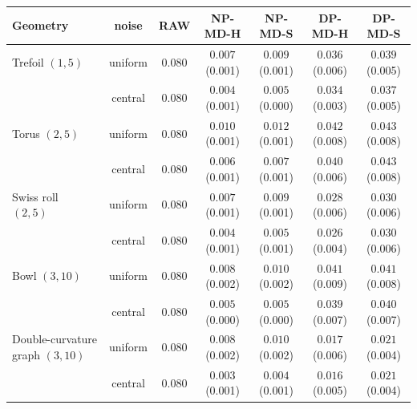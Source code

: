 \begin{tabular}{lcccccc}
\toprule
Geometry & noise & RAW & NP-MD-H & NP-MD-S & DP-MD-H & DP-MD-S \\
\midrule
Trefoil $(1,5)$ & uniform & $0.080$ & $0.007$ \scriptsize(0.001) & $0.009$ \scriptsize(0.001) & $0.036$ \scriptsize(0.006) & $0.039$ \scriptsize(0.005) \\
 & central & $0.080$ & $0.004$ \scriptsize(0.001) & $0.005$ \scriptsize(0.000) & $0.034$ \scriptsize(0.003) & $0.037$ \scriptsize(0.005) \\
\midrule
Torus $(2,5)$ & uniform & $0.080$ & $0.010$ \scriptsize(0.001) & $0.012$ \scriptsize(0.001) & $0.042$ \scriptsize(0.008) & $0.043$ \scriptsize(0.008) \\
 & central & $0.080$ & $0.006$ \scriptsize(0.001) & $0.007$ \scriptsize(0.001) & $0.040$ \scriptsize(0.006) & $0.043$ \scriptsize(0.008) \\
\midrule
Swiss roll $(2,5)$ & uniform & $0.080$ & $0.007$ \scriptsize(0.001) & $0.009$ \scriptsize(0.001) & $0.028$ \scriptsize(0.006) & $0.030$ \scriptsize(0.006) \\
 & central & $0.080$ & $0.004$ \scriptsize(0.001) & $0.005$ \scriptsize(0.001) & $0.026$ \scriptsize(0.004) & $0.030$ \scriptsize(0.006) \\
\midrule
Bowl $(3,10)$ & uniform & $0.080$ & $0.008$ \scriptsize(0.002) & $0.010$ \scriptsize(0.002) & $0.041$ \scriptsize(0.009) & $0.041$ \scriptsize(0.008) \\
 & central & $0.080$ & $0.005$ \scriptsize(0.000) & $0.005$ \scriptsize(0.000) & $0.039$ \scriptsize(0.007) & $0.040$ \scriptsize(0.007) \\
\midrule
Double-curvature graph $(3,10)$ & uniform & $0.080$ & $0.008$ \scriptsize(0.002) & $0.010$ \scriptsize(0.002) & $0.017$ \scriptsize(0.006) & $0.021$ \scriptsize(0.004) \\
 & central & $0.080$ & $0.003$ \scriptsize(0.001) & $0.004$ \scriptsize(0.001) & $0.016$ \scriptsize(0.005) & $0.021$ \scriptsize(0.004) \\
\bottomrule
\end{tabular}
